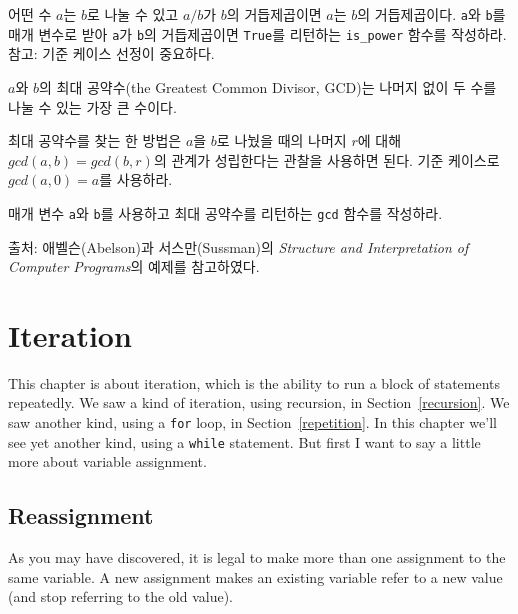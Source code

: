 \documentclass[10pt]{book}
\begin{document}
\begin{exercise}

  어떤 수 $a$는 $b$로 나눌 수 있고 $a/b$가 $b$의 거듭제곱이면 $a$는
  $b$의 거듭제곱이다. {\tt a}와 {\tt b}를 매개 변수로 받아 {\tt a}가
  {\tt b}의 거듭제곱이면 {\tt True}를 리턴하는 \verb"is_power" 함수를
  작성하라.  참고: 기준 케이스 선정이 중요하다.


\end{exercise}


\begin{exercise}

$a$와 $b$의 최대 공약수(the Greatest Common Divisor, GCD)는 나머지 없이
두 수를 나눌 수 있는 가장 큰 수이다.

최대 공약수를 찾는 한 방법은 $a$을 $b$로 나눴을 때의 나머지 $r$에 대해
$gcd(a, b) = gcd(b, r)$의 관계가 성립한다는 관찰을 사용하면 된다.  기준
케이스로 $gcd(a, 0) = a$를 사용하라.

매개 변수 {\tt a}와 {\tt b}를 사용하고 최대 공약수를 리턴하는
\verb"gcd" 함수를 작성하라.


출처: 애벨슨(Abelson)과 서스만(Sussman)의 {\em Structure and
  Interpretation of Computer Programs}의 예제를 참고하였다.

\end{exercise}


\chapter{Iteration}

This chapter is about iteration, which is the ability to run
a block of statements repeatedly.  We saw a kind of iteration,
using recursion, in Section~\ref{recursion}.
We saw another kind, using a {\tt for} loop,
in Section~\ref{repetition}.  In this chapter we'll see yet another
kind, using a {\tt while} statement.
But first I want to say a little more about variable assignment.


\section{Reassignment}

As you may have discovered, it is legal to make more than one
assignment to the same variable.  A new assignment makes an existing
variable refer to a new value (and stop referring to the old value).
\end{document}
